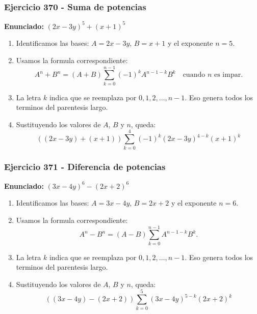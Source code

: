 \documentclass[11pt,a4paper]{article}
\begin{document}
\subsubsection*{Ejercicio 370 - Suma de potencias}
\textbf{Enunciado:} $ \left(2 x - 3 y\right)^{5}+\left(x + 1\right)^{5} $\par
\begin{enumerate}[leftmargin=2em]
\item Identificamos las bases: \(A=2 x - 3 y\), \(B=x + 1\) y el exponente \(n=5\).
\item Usamos la formula correspondiente: \[A^n+B^n=(A+B)\sum_{k=0}^{n-1}(-1)^kA^{n-1-k}B^k\quad\text{cuando }n\text{ es impar}.\]
\item La letra \(k\) indica que se reemplaza por \(0,1,2,\ldots,n-1\). Eso genera todos los terminos del parentesis largo.
\item Sustituyendo los valores de \(A\), \(B\) y \(n\), queda: \[\boxed{\left(\left(2 x - 3 y\right)+\left(x + 1\right)\right)\sum_{k=0}^{4}(-1)^k\left(2 x - 3 y\right)^{4-k}\left(x + 1\right)^k}\]
\end{enumerate}

\vspace{0.2cm}
\subsubsection*{Ejercicio 371 - Diferencia de potencias}
\textbf{Enunciado:} $ \left(3 x - 4 y\right)^{6}-\left(2 x + 2\right)^{6} $\par
\begin{enumerate}[leftmargin=2em]
\item Identificamos las bases: \(A=3 x - 4 y\), \(B=2 x + 2\) y el exponente \(n=6\).
\item Usamos la formula correspondiente: \[A^n-B^n=(A-B)\sum_{k=0}^{n-1}A^{n-1-k}B^k.\]
\item La letra \(k\) indica que se reemplaza por \(0,1,2,\ldots,n-1\). Eso genera todos los terminos del parentesis largo.
\item Sustituyendo los valores de \(A\), \(B\) y \(n\), queda: \[\boxed{\left(\left(3 x - 4 y\right)-\left(2 x + 2\right)\right)\sum_{k=0}^{5}\left(3 x - 4 y\right)^{5-k}\left(2 x + 2\right)^k}\]
\end{enumerate}

\vspace{0.2cm}
\end{document}
